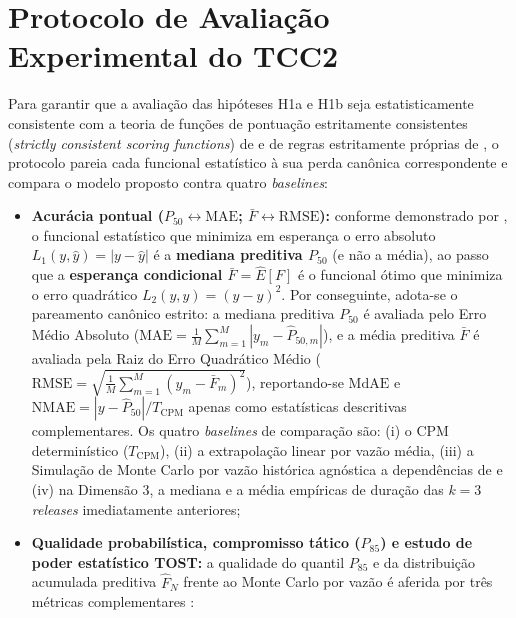 \documentclass[12pt,openany,oneside,a4paper,english,brazilian,sumario=tradicional]{abntex2}
\begin{document}
\section{Protocolo de Avaliação Experimental do TCC2}\label{sec:protocolo}

Para garantir que a avaliação das hipóteses H1a e H1b seja estatisticamente consistente com a teoria de funções de pontuação estritamente consistentes (\textit{strictly consistent scoring functions}) de  e de regras estritamente próprias de , o protocolo pareia cada funcional estatístico à sua perda canônica correspondente e compara o modelo proposto contra quatro \textit{baselines}:

\begin{itemize}
  \item \textbf{Acurácia pontual ($P_{50} \leftrightarrow \mathrm{MAE}$; $\bar{F} \leftrightarrow \mathrm{RMSE}$):} conforme demonstrado por , o funcional estatístico que minimiza em esperança o erro absoluto $L_1(y,\hat{y}) = |y - \hat{y}|$ é a \textbf{mediana preditiva $P_{50}$} (e não a média), ao passo que a \textbf{esperança condicional $\bar{F} = \hat{E}[F]$} é o funcional ótimo que minimiza o erro quadrático $L_2(y,\hat{y}) = (y - \hat{y})^2$. Por conseguinte, adota-se o pareamento canônico estrito: a mediana preditiva $P_{50}$ é avaliada pelo Erro Médio Absoluto ($\mathrm{MAE} = \frac{1}{M}\sum_{m=1}^M |y_m - \hat{P}_{50,m}|$), e a média preditiva $\bar{F}$ é avaliada pela Raiz do Erro Quadrático Médio ($\mathrm{RMSE} = \sqrt{\frac{1}{M}\sum_{m=1}^M (y_m - \bar{F}_m)^2}$), reportando-se $\mathrm{MdAE}$ e $\mathrm{NMAE} = |y-\hat{P}_{50}|/T_{\mathrm{CPM}}$ apenas como estatísticas descritivas complementares. Os quatro \textit{baselines} de comparação são: (i) o CPM determinístico ($T_{\mathrm{CPM}}$), (ii) a extrapolação linear por vazão média, (iii) a Simulação de Monte Carlo por vazão histórica agnóstica a dependências de  e (iv) na Dimensão 3, a mediana e a média empíricas de duração das $k=3$ \textit{releases} imediatamente anteriores;
  \item \textbf{Qualidade probabilística, compromisso tático ($P_{85}$) e estudo de poder estatístico TOST:} a qualidade do quantil $P_{85}$ e da distribuição acumulada preditiva $\hat{F}_N$ frente ao Monte Carlo por vazão \cite{vacanti2015} é aferida por três métricas complementares \cite{gneiting2007,schuirmann1987}:
  \begin{enumerate}

\end{enumerate}
\end{itemize}
\end{document}
